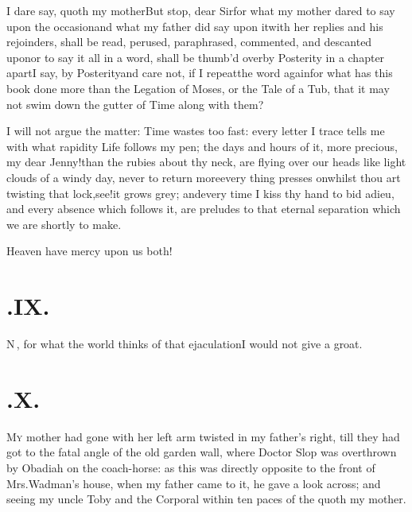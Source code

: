 \documentclass{article}
\begin{document}
I dare say, quoth my mother\tsh\break\tsk But stop, dear Sir\tsk for what my
mother dared to say upon the occasion\break\tsh and what my father did say upon
it\tsh with her replies and his rejoinders, shall be read, perused, paraphrased,
commented, and descanted upon\tsk or to say it all in a word, shall be thumb’d
over\pb by Posterity in a chapter apart\tsh I say, by Posterity\tsk and care not, if
I repeat\break the word again\tsk for what has this book done more than the Legation of
Moses, or the Tale of a Tub, that it may not swim down the gutter of Time
along with them?

I will not argue the matter: Time wastes too fast: every letter I trace tells me
with what rapidity Life follows my pen; the days and hours of it, more precious, my
dear Jenny!\@ than the rubies about thy neck, are flying over our heads like light
clouds of a windy day, never to return more\tsh every thing presses on\tsh whilst
thou art twisting that lock,\tsh see!\@ it grows grey; and\pb every time I kiss thy
hand to bid adieu, and every absence which follows it, are preludes to that eternal
separation which we are shortly to make.\tsh

\tsh Heaven have mercy upon us both!

\newpage
\section{.\enspace IX.}

\lettrine{N}{\,}, for what the world thinks of
that ejaculation\tsh I would not give a groat.

\newpage
\section{.\enspace X.}

\lettrine{M}{y} mother had gone with her left arm twisted in my father’s right, till
they had got to the fatal angle of the old garden wall, where Doctor Slop was
overthrown by Obadiah on the coach-horse: as this was directly opposite to the front
of Mrs.\@ Wadman’s house, when my father came to it, he gave a look across; and
seeing my uncle Toby and the Corporal within ten paces of the\break
{}
\vfill\eject\noindent
{}
quoth my mother.
\end{document}
